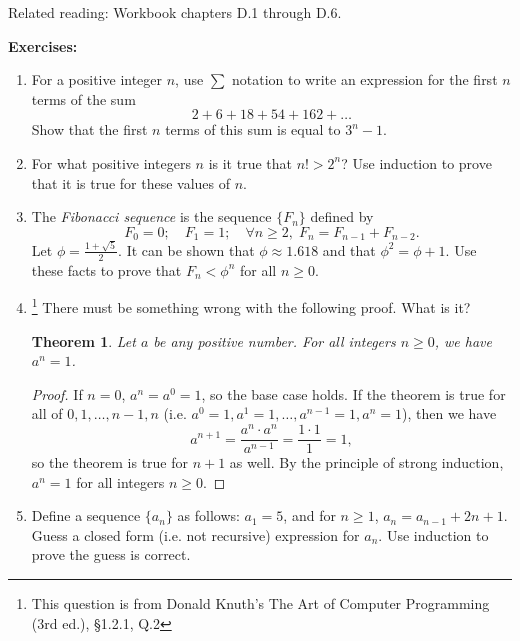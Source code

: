 \documentclass[a4paper,12pt]{article}
\newtheorem{theorem}{Theorem}
\begin{document}
\pagestyle{myheadings}


Related reading: Workbook chapters D.1 through D.6.

{\bf Exercises:}

\begin{enumerate}
\item
For a positive integer $n$, use $\sum$ notation to write an expression for the
first $n$ terms of the sum
\[
    2 + 6 + 18 + 54 + 162 + \dots
\]
Show that the first $n$ terms of this sum is equal to $3^n-1$.
\item
For what positive integers $n$ is it true that $n! > 2^n$? Use induction to
prove that it is true for these values of $n$.
\item
The {\em Fibonacci sequence} is the sequence $\{F_n\}$ defined by
\[
    F_0 = 0; \quad F_1 = 1; \quad \forall n \geq 2,\; F_n = F_{n-1} + F_{n-2}.
\]
Let $\phi = \frac{1 + \sqrt{5}}{2}$. It can be shown that $\phi \approx 1.618$
and that $\phi^2 = \phi + 1$. Use these facts to prove that $F_n < \phi^n$ for
all $n \geq 0$.
\item
\footnote{This question is from Donald Knuth's The Art of Computer
Programming (3rd ed.), \S 1.2.1, Q.2}
There must be something wrong with the following proof. What is it?
\begin{theorem}
Let $a$ be any positive number. For all integers $n \geq 0$, we have $a^n = 1$.
\end{theorem}
\begin{proof}
If $n = 0$, $a^n = a^0 = 1$, so the base case holds.
If the theorem is true for all of $0, 1, \dots, n-1, n$ (i.e. $a^0 = 1, a^1 = 1,
\dots, a^{n-1}=1, a^n = 1$), then we have
\[
    a^{n+1} = \frac{a^n \cdot a^n}{a^{n-1}} = \frac{1 \cdot 1}{1} = 1,
\]
so the theorem is true for $n+1$ as well. By the principle of strong induction,
$a^n = 1$ for all integers $n \geq 0$.
\end{proof}
\item
Define a sequence $\{a_n\}$ as follows: $a_1 = 5$, and for $n \geq 1$, $a_n =
a_{n-1} + 2n + 1$.
Guess a closed form (i.e. not recursive) expression for $a_n$. Use induction to
prove the guess is correct.
\end{enumerate}
\end{document}
